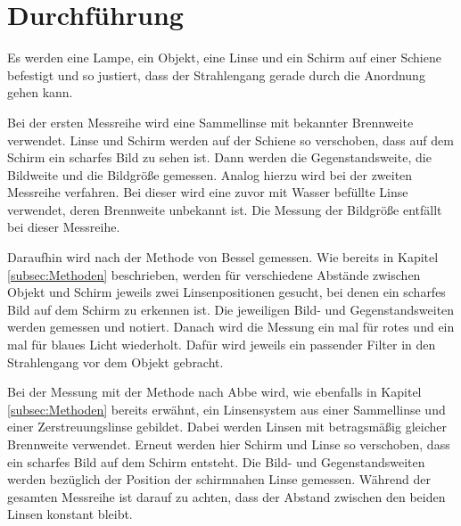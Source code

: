\section{Durchführung}
\label{sec:Durchführung}

Es werden eine Lampe, ein Objekt, eine Linse und ein Schirm auf
einer Schiene befestigt und so justiert, dass der Strahlengang gerade durch die Anordnung
gehen kann.

Bei der ersten Messreihe wird eine Sammellinse mit bekannter Brennweite verwendet.
Linse und Schirm werden auf der Schiene so verschoben, dass auf dem Schirm ein
scharfes Bild zu sehen ist. Dann werden die Gegenstandsweite, die Bildweite und
die Bildgröße gemessen. Analog hierzu wird bei der zweiten Messreihe verfahren.
Bei dieser wird eine zuvor mit Wasser befüllte Linse verwendet, deren Brennweite
unbekannt ist. Die Messung der Bildgröße entfällt bei dieser Messreihe.

Daraufhin wird nach der Methode von Bessel gemessen. Wie bereits
in Kapitel \ref{subsec:Methoden} beschrieben, werden für verschiedene Abstände zwischen
Objekt und Schirm jeweils zwei Linsenpositionen gesucht, bei denen ein scharfes Bild
auf dem Schirm zu erkennen ist. Die jeweiligen Bild- und Gegenstandsweiten werden
gemessen und notiert.
Danach wird die Messung ein mal für rotes und ein mal für blaues Licht wiederholt.
Dafür wird jeweils ein passender Filter in den Strahlengang vor dem Objekt gebracht.

Bei der Messung mit der Methode nach Abbe wird, wie ebenfalls in Kapitel \ref{subsec:Methoden}
bereits erwähnt, ein Linsensystem aus einer Sammellinse und einer Zerstreuungslinse
gebildet. Dabei werden Linsen mit betragsmäßig gleicher Brennweite verwendet.
Erneut werden hier Schirm und Linse so verschoben, dass ein scharfes Bild auf
dem Schirm entsteht. Die Bild- und Gegenstandsweiten werden bezüglich der Position
der schirmnahen Linse gemessen. Während der gesamten Messreihe ist darauf zu achten,
dass der Abstand zwischen den beiden Linsen konstant bleibt.
